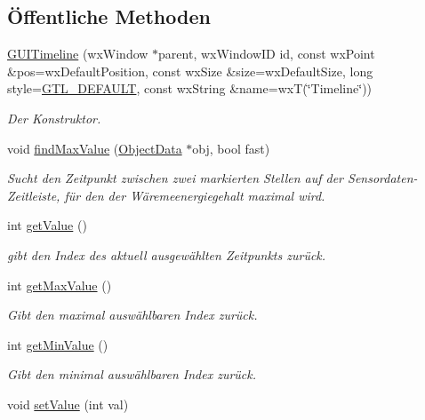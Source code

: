 \subsection*{Öffentliche Methoden}
\begin{DoxyCompactItemize}
\item 
\hyperlink{classGUITimeline_a2878c5574a3c329032e9cd94ab024d59}{G\-U\-I\-Timeline} (wx\-Window $\ast$parent, wx\-Window\-I\-D id, const wx\-Point \&pos=wx\-Default\-Position, const wx\-Size \&size=wx\-Default\-Size, long style=\hyperlink{classGUITimeline_a56f1cf170a8c077a0b94d19a0eba8c94a9c676c8ba0c3c3312938d34a8e855bb1}{G\-T\-L\-\_\-\-D\-E\-F\-A\-U\-L\-T}, const wx\-String \&name=wx\-T(\char`\"{}Timeline\char`\"{}))
\begin{DoxyCompactList}\small\item\em Der Konstruktor. \end{DoxyCompactList}\item 
void \hyperlink{classGUITimeline_a099f3654aa6e7ea04df861851a0e9ec8}{find\-Max\-Value} (\hyperlink{classObjectData}{Object\-Data} $\ast$obj, bool fast)
\begin{DoxyCompactList}\small\item\em Sucht den Zeitpunkt zwischen zwei markierten Stellen auf der Sensordaten-\/\-Zeitleiste, für den der Wäremeenergiegehalt maximal wird. \end{DoxyCompactList}\item 
int \hyperlink{classGUITimeline_a1fa405314a0be38d95798fdc205827c3}{get\-Value} ()
\begin{DoxyCompactList}\small\item\em gibt den Index des aktuell ausgewählten Zeitpunkts zurück. \end{DoxyCompactList}\item 
int \hyperlink{classGUITimeline_a90b85dd56a32b3b35498a09b116b3610}{get\-Max\-Value} ()
\begin{DoxyCompactList}\small\item\em Gibt den maximal auswählbaren Index zurück. \end{DoxyCompactList}\item 
int \hyperlink{classGUITimeline_aec94daa9bf66cd493b970b8ebb1334d5}{get\-Min\-Value} ()
\begin{DoxyCompactList}\small\item\em Gibt den minimal auswählbaren Index zurück. \end{DoxyCompactList}\item 
void \hyperlink{classGUITimeline_a0fa4ef5ed2e0fe5f416d9d4c75b86ebc}{set\-Value} (int val)

\end{DoxyCompactItemize}

